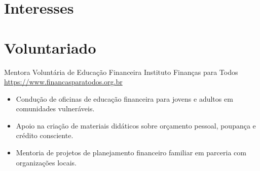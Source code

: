 \documentclass[a4paper, serif, 10pt]{moderncv}
\begin{document}
\section{Interesses}

\section{Voluntariado}

        {Mentora Voluntária de Educação Financeira}
        {Instituto Finanças para Todos}
        {\url{https://www.financasparatodos.org.br}}
        {}
        {\begin{itemize}
\item Condução de oficinas de educação financeira para jovens e adultos em comunidades vulneráveis.
\item Apoio na criação de materiais didáticos sobre orçamento pessoal, poupança e crédito consciente.
\item Mentoria de projetos de planejamento financeiro familiar em parceria com organizações locais.
\end{itemize}}
    
\end{document}
